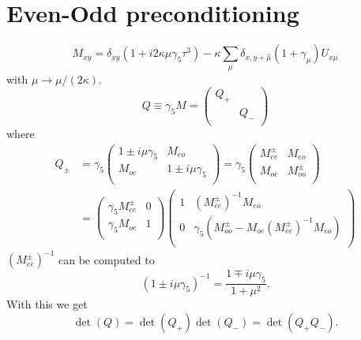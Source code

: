 \section{Even-Odd preconditioning}

\begin{equation}
  \label{eq:eo0}
  M_{xy} =\delta_{xy}(1+i2\kappa\mu\gamma_5\tau^3) - \kappa\sum_\mu \delta_{x,y+\hat\mu}(1+\gamma_\mu) U_{x\mu}
\end{equation}
with $\mu \to \mu/(2\kappa)$.
\begin{equation}
  \label{eq:eo1}
  Q\equiv \gamma_5 M = \begin{pmatrix}
      Q_+ & \\\
         & Q_- \\
      \end{pmatrix}
\end{equation}
where
\begin{equation}
  \label{eq:eo2}
  \begin{split}
    Q_\pm &= \gamma_5\begin{pmatrix}
      1\pm i\mu\gamma_5 & M_{eo} \\
      M_{oe}    & 1\pm i\mu\gamma_5 \\
    \end{pmatrix} =
    \gamma_5\begin{pmatrix}
      M_{ee}^\pm & M_{eo} \\
      M_{oe}    & M_{oo}^\pm \\
    \end{pmatrix} \\
    & =
    \begin{pmatrix}
      \gamma_5M_{ee}^\pm & 0 \\
      \gamma_5M_{oe}  & 1 \\
    \end{pmatrix}
    \begin{pmatrix}
      1       & (M_{ee}^\pm)^{-1}M_{eo}\\
      0       & \gamma_5(M_{oo}^\pm-M_{oe}(M_{ee}^\pm)^{-1}M_{eo})\\
    \end{pmatrix}
\end{split}
\end{equation}
$(M_{ee}^\pm)^{-1}$ can be computed to 
\[
(1\pm i\mu\gamma_5)^{-1} = \frac{1\mp i\mu\gamma_5}{1+\mu^2}.
\]
With this we get
\begin{equation}
  \label{eq:eo3}
  \det(Q)=\det(Q_+)\det(Q_-) = \det(Q_+ Q_-).
\end{equation}

